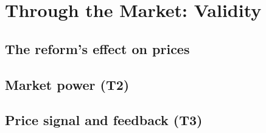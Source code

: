 \chapter{Through the Market: Validity}\label{ch:validity}

\section{The reform's effect on prices}

\section{Market power (T2)}
\section{Price signal and feedback (T3)}
